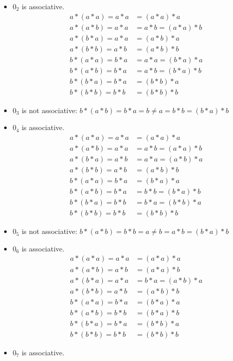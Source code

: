 \begin{enumerate}[label={\Alph*.},font={\bfseries}]
\begin{enumerate}[label={\arabic*},font={\bfseries}]
\begin{itemize}
    \item $0_2$ is associative.
      \begin{align*}
        a*(a*a) = a*a &= (a*a)*a \\
        a*(a*b) = a*a &= a*b = (a*a)*b \\
        a*(b*a) = a*a &= (a*b)*a \\
        a*(b*b) = a*b &= (a*b)*b \\
        b*(a*a) = b*a &= a*a = (b*a)*a \\
        b*(a*b) = b*a &= a*b = (b*a)*b \\
        b*(b*a) = b*a &= (b*b)*a \\
        b*(b*b) = b*b &= (b*b)*b
      \end{align*}
    \item $0_3$ is not associative: $b*(a*b)=b*a=b \neq a=b*b=(b*a)*b$
    \item $0_4$ is associative.
      \begin{align*}
        a*(a*a) = a*a &= (a*a)*a \\
        a*(a*b) = a*a &= a*b = (a*a)*b \\
        a*(b*a) = a*b &= a*a = (a*b)*a \\
        a*(b*b) = a*b &= (a*b)*b \\
        b*(a*a) = b*a &= (b*a)*a \\
        b*(a*b) = b*a &= b*b = (b*a)*b \\
        b*(b*a) = b*b &= b*a = (b*b)*a \\
        b*(b*b) = b*b &= (b*b)*b
      \end{align*}
    \item $0_5$ is not associative: $b*(a*b)=b*b=a \neq b=a*b=(b*a)*b$
    \item $0_6$ is associative.
      \begin{align*}
        a*(a*a) = a*a &= (a*a)*a\\
        a*(a*b) = a*b &= (a*a)*b\\
        a*(b*a) = a*a &= b*a = (a*b)*a \\
        a*(b*b) = a*b &= (a*b)*b \\
        b*(a*a) = b*a &= (b*a)*a \\
        b*(a*b) = b*b &= (b*a)*b \\
        b*(b*a) = b*a &= (b*b)*a \\
        b*(b*b) = b*b &= (b*b)*b
      \end{align*}
    \item $0_7$ is associative.

\end{itemize}
\end{enumerate}
\end{enumerate}
